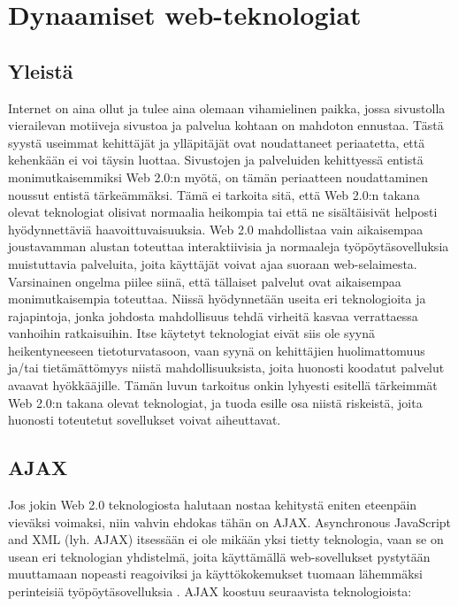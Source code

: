 
\chapter{Dynaamiset web-teknologiat}

\section{Yleistä}

Internet on aina ollut ja tulee aina olemaan vihamielinen paikka, jossa sivustolla vierailevan motiiveja sivustoa ja palvelua kohtaan on mahdoton ennustaa. Tästä syystä 
useimmat kehittäjät ja ylläpitäjät ovat noudattaneet periaatetta, että kehenkään ei voi täysin luottaa. Sivustojen ja palveluiden kehittyessä entistä monimutkaisemmiksi
Web 2.0:n myötä, on tämän periaatteen noudattaminen noussut entistä tärkeämmäksi. Tämä ei tarkoita sitä, että Web 2.0:n takana olevat teknologiat olisivat normaalia 
heikompia tai että ne sisältäisivät helposti hyödynnettäviä haavoittuvaisuuksia. Web 2.0 mahdollistaa vain aikaisempaa joustavamman alustan toteuttaa interaktiivisia ja
normaaleja työpöytäsovelluksia muistuttavia palveluita, joita käyttäjät voivat ajaa suoraan web-selaimesta. Varsinainen ongelma piilee siinä, että tällaiset palvelut ovat 
aikaisempaa monimutkaisempia toteuttaa. Niissä hyödynnetään useita eri teknologioita ja rajapintoja, jonka johdosta mahdollisuus tehdä virheitä kasvaa verrattaessa
vanhoihin ratkaisuihin. Itse käytetyt teknologiat eivät siis ole syynä heikentyneeseen tietoturvatasoon, vaan syynä on kehittäjien huolimattomuus ja/tai tietämättömyys 
niistä mahdollisuuksista, joita huonosti koodatut palvelut avaavat hyökkääjille. Tämän luvun tarkoitus onkin lyhyesti esitellä tärkeimmät Web 2.0:n takana olevat teknologiat, 
ja tuoda esille osa niistä riskeistä, joita huonosti toteutetut sovellukset voivat aiheuttavat. 

\section {AJAX}

Jos jokin Web 2.0 teknologiosta halutaan nostaa kehitystä eniten eteenpäin vieväksi voimaksi, niin vahvin ehdokas tähän on AJAX.  Asynchronous JavaScript and XML (lyh. AJAX)
itsessään ei ole mikään yksi tietty teknologia, vaan se on usean eri teknologian yhdistelmä, joita käyttämällä web-sovellukset pystytään muuttamaan nopeasti reagoiviksi
ja käyttökokemukset tuomaan lähemmäksi perinteisiä työpöytäsovelluksia \cite{AJAX}. AJAX koostuu seuraavista teknologioista:

